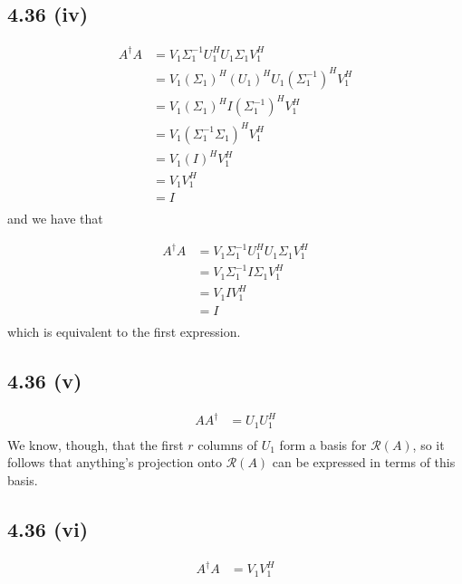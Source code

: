 \documentclass[letterpaper,12pt]{article}
\theoremstyle{definition}
\begin{document}
\subsection*{4.36 (iv)}


\begin{align*}
    A^\dagger A &=  V_1 \Sigma^{-1}_1 U_1^H U_1 \Sigma_1 V_1^H  \\
                    &= V_1(\Sigma_1)^H(U_1)^HU_1 (\Sigma^{-1}_1)^HV_1^H\\
                    &= V_1(\Sigma_1)^H I (\Sigma^{-1}_1)^HV_1^H\\
                    &= V_1(\Sigma^{-1}_1\Sigma_1)^H V_1^H\\
                    &= V_1(I)^H V_1^H\\
                    &= V_1 V_1^H\\
                    &= I\\
\end{align*}
and we have that

\begin{align*}
    A^\dagger A &= V_1 \Sigma^{-1}_1 U_1^H U_1 \Sigma_1 V_1^H  \\
&= V_1 \Sigma^{-1}_1 I \Sigma_1 V_1^H  \\
&= V_1  I  V_1^H  \\
&= I    \\
\end{align*}
which is equivalent to the first expression.

\subsection*{4.36 (v)}

\begin{align*}
    A A^\dagger &= U_1    U_1^H  \\
\end{align*}
We know, though, that the first $r$ columns of $U_1$ form a basis for $\mathscr{R}(A)$, so it follows that anything's projection onto $\mathscr{R}(A)$ can be expressed in terms of this basis.


\subsection*{4.36 (vi)}

\begin{align*}
     A^\dagger A&= V_1    V_1^H  \\
\end{align*}
\end{document}
